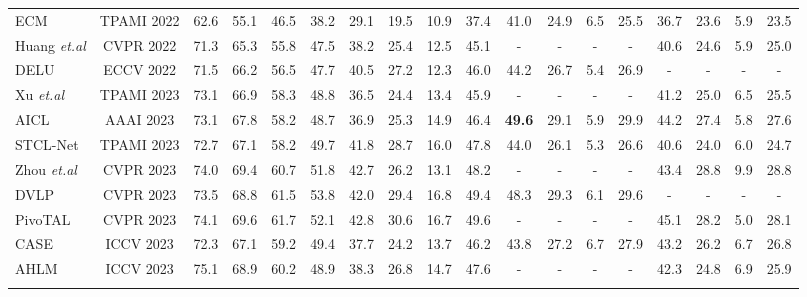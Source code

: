 \begin{table*}[htb]
{\begin{tabular}{lc|cccccccccccccccc}
ECM \cite{zhao2022equivalent}& TPAMI 2022& 62.6& 55.1& 46.5& 38.2& 29.1& 19.5& 10.9& \multicolumn{1}{c|}{37.4}& 41.0& 24.9& 6.5& \multicolumn{1}{c|}{25.5}& 36.7& 23.6& 5.9& 23.5          \\
Huang \textit{et.al} \cite{huang2022weakly}& CVPR 2022& 71.3& 65.3& 55.8& 47.5& 38.2& 25.4& 12.5& \multicolumn{1}{c|}{45.1}& -& -& -& \multicolumn{1}{c|}{-}& 40.6& 24.6& 5.9& 25.0          \\
DELU \cite{chen2022dual}& ECCV 2022& 71.5& 66.2& 56.5& 47.7& 40.5& 27.2& 12.3& \multicolumn{1}{c|}{46.0}& 44.2& 26.7& 5.4& \multicolumn{1}{c|}{26.9}& -& -& -& -             \\
Xu \textit{et.al} \cite{xu2023bilateral}& TPAMI 2023& 73.1& 66.9& 58.3& 48.8& 36.5& 24.4& 13.4& \multicolumn{1}{c|}{45.9}& -& -& -& \multicolumn{1}{c|}{-}& 41.2& 25.0& 6.5& 25.5          \\
AICL \cite{li2023actionness}& AAAI 2023& 73.1& 67.8& 58.2& 48.7& 36.9& 25.3& 14.9& \multicolumn{1}{c|}{46.4}& \textbf{49.6}& 29.1& 5.9& \multicolumn{1}{c|}{29.9}& 44.2& 27.4& 5.8& 27.6          \\
STCL-Net \cite{fu2023semantic}& TPAMI 2023& 72.7& 67.1& 58.2& 49.7& 41.8& 28.7& 16.0& \multicolumn{1}{c|}{47.8}& 44.0 & 26.1& 5.3& \multicolumn{1}{c|}{26.6}& 40.6& 24.0& 6.0& 24.7          \\
Zhou \textit{et.al} \cite{zhou2023improving}& CVPR 2023& 74.0& 69.4& 60.7& 51.8& 42.7& 26.2& 13.1& \multicolumn{1}{c|}{48.2}& -& -& -& \multicolumn{1}{c|}{-}& 43.4& 28.8& 9.9& 28.8          \\
DVLP \cite{ju2023distilling}& CVPR 2023& 73.5& 68.8& 61.5& 53.8& 42.0& 29.4& 16.8& \multicolumn{1}{c|}{49.4}& 48.3& 29.3& 6.1& \multicolumn{1}{c|}{29.6}& -& -& -& -             \\
PivoTAL \cite{rizve2023pivotal}& CVPR 2023& 74.1& 69.6& 61.7& 52.1& 42.8& 30.6& 16.7& \multicolumn{1}{c|}{49.6}& -& -& -& \multicolumn{1}{c|}{-}& 45.1& 28.2& 5.0& 28.1          \\ 
CASE \cite{liu2023revisiting}& ICCV 2023& 72.3& 67.1& 59.2& 49.4 & 37.7& 24.2 & 13.7& \multicolumn{1}{c|}{46.2}& 43.8& 27.2& 6.7& \multicolumn{1}{c|}{27.9}& 43.2& 26.2& 6.7& 26.8          \\
AHLM \cite{wang2023weakly}& ICCV 2023& 75.1& 68.9& 60.2& 48.9& 38.3& 26.8& 14.7& \multicolumn{1}{c|}{47.6}& -& -& -& \multicolumn{1}{c|}{-}& 42.3& 24.8& 6.9& 25.9          \\

\hdashline[5pt/1pt]


\end{tabular}}
\end{table*}
